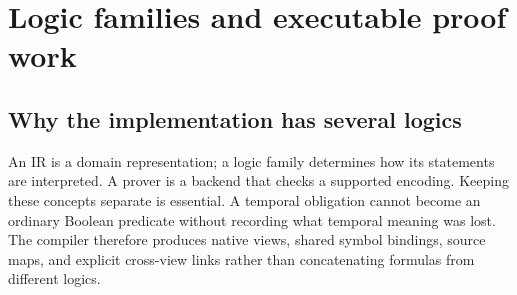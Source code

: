 \documentclass{article}
\begin{document}
\section{Logic families and executable proof work}

\subsection{Why the implementation has several logics}

An IR is a domain representation; a logic family determines how its statements are interpreted. A prover is a backend that checks a supported encoding. Keeping these concepts separate is essential. A temporal obligation cannot become an ordinary Boolean predicate without recording what temporal meaning was lost. The compiler therefore produces native views, shared symbol bindings, source maps, and explicit cross-view links rather than concatenating formulas from different logics.
\begingroup
\renewcommand{\thetable}{2}
\end{document}
